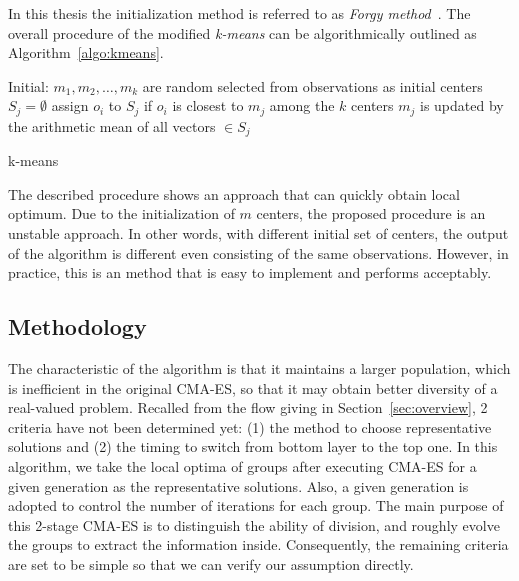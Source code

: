 In this thesis the initialization method is referred to as \emph{Forgy
method}~\cite{Forgy65}.
The overall procedure of the modified \emph{k-means} can be algorithmically
outlined as Algorithm~\ref{algo:kmeans}.

\begin{algorithm}[H]
  \label{algo:kmeans}
	   Initial: $m_1, m_2,\ldots, m_k$ are
	random selected from observations as initial centers\;  {  { $S_j =
		\emptyset$	\; }  { assign $o_i$ to $S_j$ if $o_i$ is
		closest to $m_j$ among the $k$ centers\; }  { $m_j$ is
	updated by the arithmetic mean of all vectors $\in S_j$\; } } 
  \caption{k-means}
\end{algorithm}

The described procedure shows an approach that can quickly obtain local
optimum.
Due to the initialization of $m$ centers, the proposed procedure is an
unstable approach.
In other words, with different initial set of centers, the output of the
algorithm is different even consisting of the same observations.
However, in practice, this is an method that is easy to
implement and performs acceptably.


\subsection{Methodology}

The characteristic of the algorithm is that it maintains a larger
population, which is inefficient in the original CMA-ES, so that it may
obtain better diversity of a real-valued problem.
Recalled from the flow giving in Section~\ref{sec:overview}, 2 criteria
have not been determined yet: (1) the method to choose representative
solutions and (2) the timing to switch from bottom layer to the top one.
In this algorithm, we take the local optima of groups after executing
CMA-ES for a given generation as the representative solutions.
Also, a given generation is adopted to control the number of iterations
for each group.
The main purpose of this 2-stage CMA-ES is to distinguish the ability of
division, and roughly evolve the groups to extract the information
inside.
Consequently, the remaining criteria are set to be simple so that we can
verify our assumption directly.

